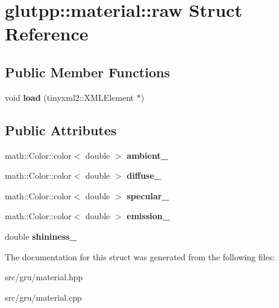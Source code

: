 \hypertarget{structglutpp_1_1material_1_1raw}{\section{glutpp\-:\-:material\-:\-:raw \-Struct \-Reference}
\label{structglutpp_1_1material_1_1raw}
}
\subsection*{\-Public \-Member \-Functions}
\begin{DoxyCompactItemize}
\item 
\hypertarget{structglutpp_1_1material_1_1raw_acf689c9d6f960423b18174104d1c7c1a}{void {\bfseries load} (tinyxml2\-::\-X\-M\-L\-Element $\ast$)}\label{structglutpp_1_1material_1_1raw_acf689c9d6f960423b18174104d1c7c1a}

\end{DoxyCompactItemize}
\subsection*{\-Public \-Attributes}
\begin{DoxyCompactItemize}
\item 
\hypertarget{structglutpp_1_1material_1_1raw_ac0c0b2ec3b40ff095217d7e5b37a7765}{math\-::\-Color\-::color$<$ double $>$ {\bfseries ambient\-\_\-}}\label{structglutpp_1_1material_1_1raw_ac0c0b2ec3b40ff095217d7e5b37a7765}

\item 
\hypertarget{structglutpp_1_1material_1_1raw_ab99d372fb50b80c04563cab7bbe42eab}{math\-::\-Color\-::color$<$ double $>$ {\bfseries diffuse\-\_\-}}\label{structglutpp_1_1material_1_1raw_ab99d372fb50b80c04563cab7bbe42eab}

\item 
\hypertarget{structglutpp_1_1material_1_1raw_a6d444ff878d55556869ed8d28a4ad13c}{math\-::\-Color\-::color$<$ double $>$ {\bfseries specular\-\_\-}}\label{structglutpp_1_1material_1_1raw_a6d444ff878d55556869ed8d28a4ad13c}

\item 
\hypertarget{structglutpp_1_1material_1_1raw_a437f25c5f3d890cb5e79618c44c593bf}{math\-::\-Color\-::color$<$ double $>$ {\bfseries emission\-\_\-}}\label{structglutpp_1_1material_1_1raw_a437f25c5f3d890cb5e79618c44c593bf}

\item 
\hypertarget{structglutpp_1_1material_1_1raw_a0cb37e7cae90a758c488bdf1dd8fd63c}{double {\bfseries shininess\-\_\-}}\label{structglutpp_1_1material_1_1raw_a0cb37e7cae90a758c488bdf1dd8fd63c}

\end{DoxyCompactItemize}


\-The documentation for this struct was generated from the following files\-:\begin{DoxyCompactItemize}
\item 
src/gru/material.\-hpp\item 
src/gru/material.\-cpp\end{DoxyCompactItemize}
